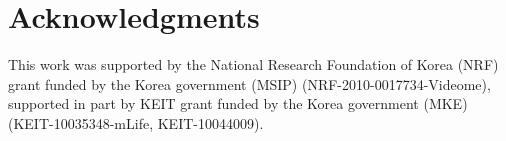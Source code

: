 \documentclass[10pt,letterpaper]{article}
\begin{document}
\section{Acknowledgments}

This work was supported by the National Research Foundation of Korea (NRF) grant funded by the Korea government (MSIP) (NRF-2010-0017734-Videome), supported in part by KEIT grant funded by the Korea government (MKE) (KEIT-10035348-mLife, KEIT-10044009).



\setlength{\bibleftmargin}{.125in}
\setlength{\bibindent}{-\bibleftmargin}


\end{document}
